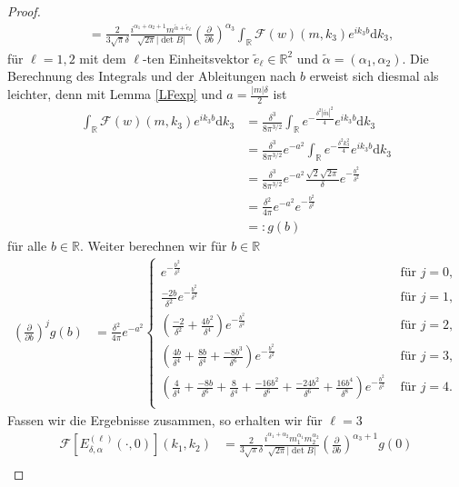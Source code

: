 \documentclass[12pt,a4paper]{scrartcl}
\newcommand{\dd}{\mathrm{d}}
\numberwithin{equation}{section}
\newcommand{\R}{\mathbb{R}} %
\newcommand{\F}{\mathcal{F}} %
\begin{document}
\begin{proof}
\begin{align*}
&= \frac{2}{3\sqrt{\pi}\delta} \frac{
i^{\alpha_1 +\alpha_2+1} m^{\widetilde \alpha+ \widetilde e_\ell}}{
\sqrt{2\pi} |\det B|}
\left(\frac{\partial}{\partial b}\right)^{\alpha_3} \int_{\R} \F(w)(m,k_3) e^{i k_3 b} \dd k_3,
\end{align*}
für $\ell=1,2$ mit dem $\ell$-ten Einheitsvektor $\widetilde e_\ell \in \R^2$ und $\widetilde \alpha= (\alpha_1,\alpha_2)$.
Die Berechnung des Integrals und der Ableitungen nach $b$ erweist sich diesmal als leichter, denn mit Lemma \ref{LFexp} und $a=\frac{|m|\delta}{2}$ ist
\begin{align*}
\int_{\R} \F(w)(m,k_3) e^{i k_3 b} \dd k_3 
&= \frac{\delta^3}{8 \pi^{3/2}} \int_{\R} e^{-\frac{\delta^2 |\widetilde m|^2}{4}} e^{i k_3 b} \dd k_3 \\
&= \frac{\delta^3}{8 \pi^{3/2}}e^{-a^2} \int_{\R} e^{-\frac{\delta^2 k_3^2}{4}} e^{i k_3 b} \dd k_3 \\
&= \frac{\delta^3}{8 \pi^{3/2}}e^{-a^2} \frac{\sqrt{2} \sqrt{2 \pi}}{\delta} e^{-\frac{b^2}{\delta^2}} \\
&= \frac{\delta^2}{4 \pi}e^{-a^2} e^{-\frac{b^2}{\delta^2}} \\
&=: g(b) 
\end{align*}
für alle $b \in \R$.
Weiter berechnen wir für $b \in \R$
\begin{align*}
\left(\frac{\partial}{\partial b}\right)^j g(b) 
&=\frac{\delta^2}{4 \pi}e^{-a^2}  \begin{cases} 
e^{-\frac{b^2}{\delta^2}} 
&\text{ für } j=0,\\ 
\frac{-2b}{\delta^2} 
e^{-\frac{b^2}{\delta^2}} &\text{ für } j=1,\\ 
\left(\frac{-2}{\delta^2}+ \frac{4b^2}{\delta^4} \right)
e^{-\frac{b^2}{\delta^2}} &\text{ für } j=2,\\ 
\left(\frac{4b}{\delta^4}+ \frac{8b}{\delta^4}+\frac{-8b^3}{\delta^6} \right)
e^{-\frac{b^2}{\delta^2}} &\text{ für } j=3,\\
\left(\frac{4}{\delta^4}+\frac{-8b}{\delta^6}+\frac{8}{\delta^4}+\frac{-16 b^2}{\delta^6}+\frac{-24b^2}{\delta^6}+\frac{16b^4}{\delta^8} \right)
e^{-\frac{b^2}{\delta^2}} &\text{ für } j=4.\\
\end{cases}
\end{align*}
Fassen wir die Ergebnisse zusammen, so erhalten wir für  $\ell=3$
\begin{align*}
\F [E_{\delta,\alpha}^{(\ell)}(\cdot,0) ](k_1,k_2) &= \frac{2}{3\sqrt{\pi}\delta} \frac{i^{\alpha_1 +\alpha_2} m_1^{\alpha_1}m_2^{\alpha_2}}{\sqrt{2\pi} |\det B|}\left(\frac{\partial}{\partial b}\right)^{\alpha_3+1} g(0) \\

\end{align*}
\end{proof}
\end{document}
